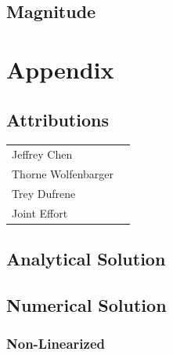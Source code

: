 \documentclass[12pt]{report}
\begin{document}
\begin{flushleft}
\subsection{Magnitude}

\section{Appendix} \label{appendix}

\subsection{Attributions}

\onehalfspacing
\begin{tabular}{ll}
Jeffrey Chen & \\
Thorne Wolfenbarger & \\
Trey Dufrene & \\
Joint Effort &
\end{tabular}
\singlespacing

\subsection{Analytical Solution}
\newpage
\subsection{Numerical Solution} \label{appendix:numerical}
\subsubsection{Non-Linearized}


\end{flushleft}
\end{document}
